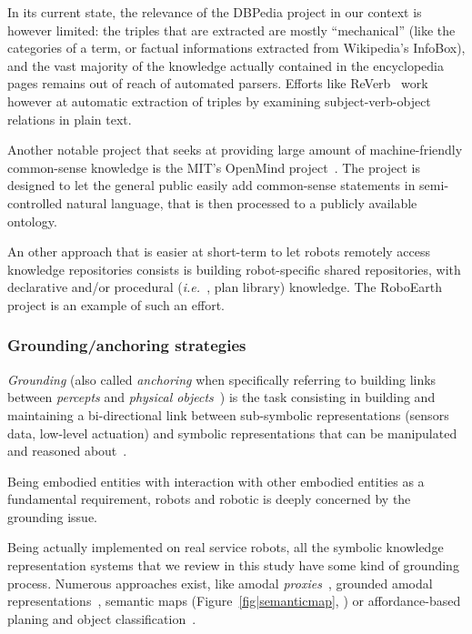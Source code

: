 \documentclass[a4paper, twocolumn]{article}
\newcommand{\ie}{{\textit{i.e.\ }}}
\begin{document}
In its current state, the relevance of the DBPedia project in our context is
however limited: the triples that are extracted are mostly ``mechanical'' (like
the categories of a term, or factual informations extracted from Wikipedia's
InfoBox), and the vast majority of the knowledge actually contained in the
encyclopedia pages remains out of reach of automated parsers. Efforts like {\sc
ReVerb}~\cite{Fader2011} work however at automatic extraction of triples by
examining subject-verb-object relations in plain text.

Another notable project that seeks at providing large amount of
machine-friendly common-sense knowledge is the MIT's OpenMind
project~\cite{Singh2002}. The project is designed to let the general public
easily add common-sense statements in semi-controlled natural language, that is
then processed to a publicly available ontology.

An other approach that is easier at short-term to let robots remotely access
knowledge repositories consists is building robot-specific shared repositories,
with declarative and/or procedural (\ie, plan library) knowledge. The
RoboEarth~\cite{Waibel2011} project is an example of such an effort.

\subsubsection{Grounding/anchoring strategies}
\label{sect|grounding}

\emph{Grounding} (also called \emph{anchoring} when specifically referring to
building links between \emph{percepts} and \emph{physical
objects}~\cite{Coradeschi2003}) is the task consisting in building and
maintaining a bi-directional link between sub-symbolic representations (sensors
data, low-level actuation) and symbolic representations that can be
manipulated and reasoned about~\cite{Harnad1990}.

Being embodied entities with interaction with other embodied entities as a
fundamental requirement, robots and robotic is deeply concerned by the
grounding issue.

Being actually implemented on real service robots, all the symbolic knowledge
representation systems that we review in this study have some kind of grounding
process. Numerous approaches exist, like amodal
\emph{proxies}~\cite{Jacobsson2008}, grounded amodal
representations~\cite{Alami2011, Mavridis2006}, semantic maps
(Figure~\ref{fig|semanticmap}, \cite{Nuechter2008, Galindo2008,Blodow2011}) or
affordance-based planing and object classification~\cite{Lorken2008,
Varadarajan2011}.
\end{document}
